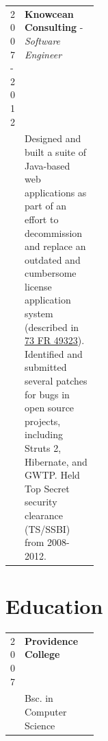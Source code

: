 \documentclass[10pt]{article}   	%
\begin{document}
\begin{center}
\begin{tabularx}{\linewidth}{p{0.15\linewidth} | X}
	\hfill 2007-2012 &{\bf Knowcean Consulting} - {\it Software Engineer}\vspace{5pt} \\
					&{Designed and built a suite of Java-based web applications as part of an effort to decommission and replace an outdated and cumbersome license application system (described in \href{https://www.federalregister.gov/documents/2008/08/21/E8-18852/mandatory-electronic-filing-of-export-and-reexport-license-applications-classification-requests}{73 FR 49323}). Identified and submitted several patches for bugs in open source projects, including Struts 2, Hibernate, and GWTP. Held Top Secret security clearance (TS/SSBI) from 2008-2012. }\vspace{14pt}\\

	
	\end{tabularx}
\end{center}


\section*{Education}
\begin{center}
	\begin{tabularx}{\linewidth}{p{0.15\linewidth} | X}
	\hfill 2007			&{\bf Providence College}\vspace{5pt} \\
					&{Bsc. in Computer Science}\vspace{14pt}\\

	\end{tabularx}
\end{center}
\end{document}
